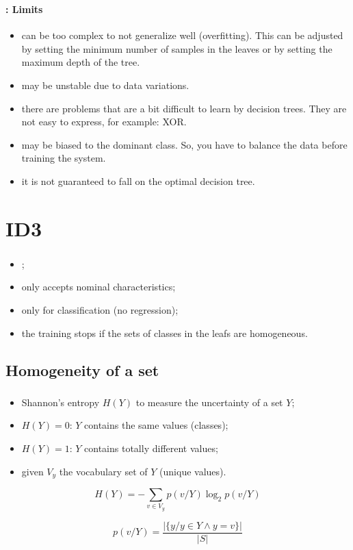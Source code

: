 \documentclass[xcolor=table]{beamer}
\begin{document}
\begin{frame}
	\frametitle{\insertsection}
	\framesubtitle{\insertsubsection: Limits}
	
	\begin{itemize}
		\item can be too complex to not generalize well (overfitting). This can be adjusted by setting the minimum number of samples in the leaves or by setting the maximum depth of the tree.
		\item may be unstable due to data variations.
		\item there are problems that are a bit difficult to learn by decision trees. They are not easy to express, for example: XOR.
		\item may be biased to the dominant class. So, you have to balance the data before training the system.
		\item it is not guaranteed to fall on the optimal decision tree.
	\end{itemize}
	
\end{frame}

\section{ID3}

\begin{frame}
	\frametitle{\insertsection}
	
	\begin{itemize}
		\item {};
		\item only accepts nominal characteristics;
		\item only for classification (no regression);
		\item the training stops if the sets of classes in the leafs are homogeneous.
	\end{itemize}
	
\end{frame}

\subsection{Homogeneity of a set}

\begin{frame}
	\frametitle{\insertsection}
	\framesubtitle{\insertsubsection}
	
	\begin{itemize}
		\item Shannon's entropy $H(Y)$ to measure the uncertainty of a set $Y$;
		\item $H(Y)=0$: $Y$ contains the same values (classes);
		\item $H(Y)=1$: $Y$ contains totally different values;
		\item given $V_y$ the vocabulary set of $Y$ (unique values).
	\end{itemize}

	\[H(Y) = - \sum\limits_{v \in V_y} p(v/Y) \log_2 p(v/Y)\]
	
	\[p(v/Y) = \frac{|\{y / y \in Y \wedge y = v\}|}{|S|}\]
	
\end{frame}
\end{document}
